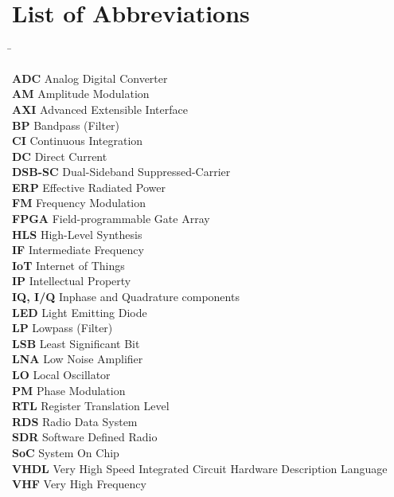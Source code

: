 \chapter{List of Abbreviations}
\label{cha:listabbrev}

\begin{tabbing}
\hspace{25 mm}\=\kill

\textbf{ADC}       \> Analog Digital Converter\\
\textbf{AM}        \> Amplitude Modulation\\
\textbf{AXI}       \> Advanced Extensible Interface\\
\textbf{BP}        \> Bandpass (Filter)\\
\textbf{CI}        \> Continuous Integration\\
\textbf{DC}        \> Direct Current\\
\textbf{DSB-SC}    \> Dual-Sideband Suppressed-Carrier\\
\textbf{ERP}       \> Effective Radiated Power\\
\textbf{FM}        \> Frequency Modulation\\
\textbf{FPGA}      \> Field-programmable Gate Array\\
\textbf{HLS}       \> High-Level Synthesis\\
\textbf{IF}        \> Intermediate Frequency\\
\textbf{IoT}       \> Internet of Things\\
\textbf{IP}        \> Intellectual Property\\
\textbf{IQ, I/Q}   \> Inphase and Quadrature components\\
\textbf{LED}       \> Light Emitting Diode\\
\textbf{LP}        \> Lowpass (Filter)\\
\textbf{LSB}       \> Least Significant Bit\\
\textbf{LNA}       \> Low Noise Amplifier\\
\textbf{LO}        \> Local Oscillator\\
\textbf{PM}        \> Phase Modulation\\
\textbf{RTL}       \> Register Translation Level\\
\textbf{RDS}       \> Radio Data System\\
\textbf{SDR}       \> Software Defined Radio\\
\textbf{SoC}       \> System On Chip\\
\textbf{VHDL}      \> Very High Speed Integrated Circuit Hardware Description Language\\
\textbf{VHF}       \> Very High Frequency\\

\end{tabbing}
